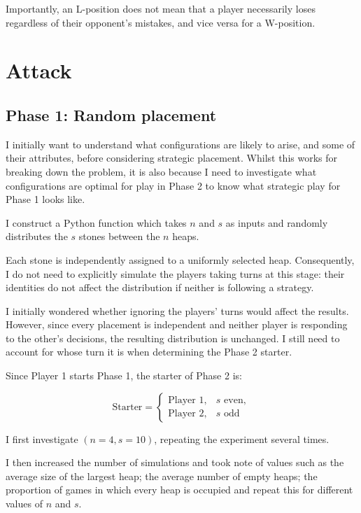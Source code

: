 \documentclass[11pt]{article}
\newcommand{\keywordfont}{\textsc}
\newcommand{\keyword}[1]{%
  \marginpar{\raggedright\small\keywordfont{#1}}}
\begin{document}
Importantly, an L-position does not mean that a player necessarily loses regardless of their opponent's mistakes, and vice versa for a W-position.

\section{Attack}

\subsection{Phase 1: Random placement}

I initially want to understand what configurations are likely to arise, and some of their attributes, before considering strategic placement. Whilst this works for breaking down the problem, it is also because I need to investigate what configurations are optimal for play in Phase 2 to know what strategic play for Phase 1 looks like.

I construct a Python function which takes $n$ and $s$ as inputs and randomly distributes the $s$ stones between the $n$ heaps.

Each stone is independently assigned to a uniformly selected heap. Consequently, I do not need to explicitly simulate the players taking turns at this stage: their identities do not affect the distribution if neither is following a strategy.

\keyword{Pause}
I initially wondered whether ignoring the players' turns would affect the results. However, since every placement is independent and neither player is responding to the other's decisions, the resulting distribution is unchanged. I still need to account for whose turn it is when determining the Phase 2 starter.

Since Player 1 starts Phase 1, the starter of Phase 2 is:

\[
\text{Starter}=
\begin{cases}
\text{Player } 1,&s\text{ even},\\
\text{Player } 2,&s\text{ odd}
\end{cases}
\]

I first investigate $(n=4,s=10)$, repeating the experiment several times.

I then increased the number of simulations and took note of values such as the average size of the largest heap; the average number of empty heaps; the proportion of games in which every heap is occupied and repeat this for different values of $n$ and $s$.
\end{document}
